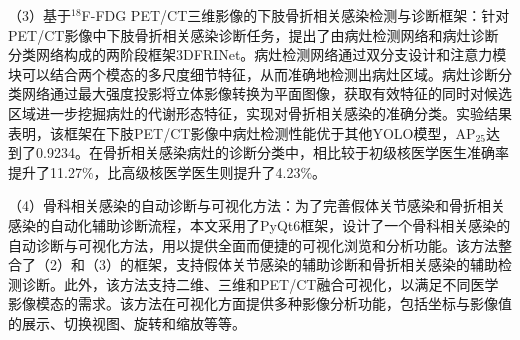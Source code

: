 \begin{cabstract}
    （3）基于\(^{18}\)F-FDG PET/CT三维影像的下肢骨折相关感染检测与诊断框架：针对PET/CT影像中下肢骨折相关感染诊断任务，提出了由病灶检测网络和病灶诊断分类网络构成的两阶段框架3DFRINet。病灶检测网络通过双分支设计和注意力模块可以结合两个模态的多尺度细节特征，从而准确地检测出病灶区域。病灶诊断分类网络通过最大强度投影将立体影像转换为平面图像，获取有效特征的同时对候选区域进一步挖掘病灶的代谢形态特征，实现对骨折相关感染的准确分类。实验结果表明，该框架在下肢PET/CT影像中病灶检测性能优于其他YOLO模型，AP\(_{25}\)达到了0.9234。在骨折相关感染病灶的诊断分类中，相比较于初级核医学医生准确率提升了11.27\%，比高级核医学医生则提升了4.23\%。

    （4）骨科相关感染的自动诊断与可视化方法：为了完善假体关节感染和骨折相关感染的自动化辅助诊断流程，本文采用了PyQt6框架，设计了一个骨科相关感染的自动诊断与可视化方法，用以提供全面而便捷的可视化浏览和分析功能。该方法整合了（2）和（3）的框架，支持假体关节感染的辅助诊断和骨折相关感染的辅助检测诊断。此外，该方法支持二维、三维和PET/CT融合可视化，以满足不同医学影像模态的需求。该方法在可视化方面提供多种影像分析功能，包括坐标与影像值的展示、切换视图、旋转和缩放等等。

\end{cabstract}


